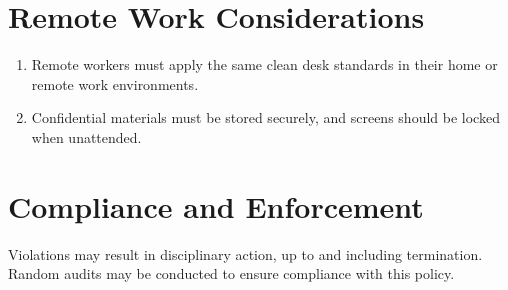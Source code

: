 \section{Remote Work Considerations}
\begin{enumerate}
    \item Remote workers must apply the same clean desk standards in their home or remote work environments.
    \item Confidential materials must be stored securely, and screens should be locked when unattended.
\end{enumerate}
\section{Compliance and Enforcement}
Violations may result in disciplinary action, up to and including termination. Random audits may be conducted to ensure compliance with this policy.
    
    

